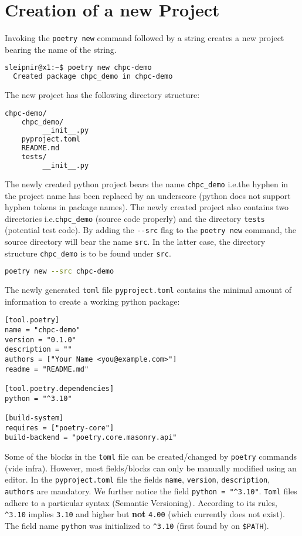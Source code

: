 \documentclass[10pt]{article}
\begin{document}
\section{Creation of a new Project}
Invoking the \lstinline[language=bash]{poetry new} command followed by a string creates a new project bearing the name of the string.
\begin{lstlisting}[language=bash]
sleipnir@x1:~$ poetry new chpc-demo
  Created package chpc_demo in chpc-demo
\end{lstlisting}
The new project has the following directory structure:
\begin{lstlisting}[language=bash]
chpc-demo/
    chpc_demo/
         __init__.py
    pyproject.toml
    README.md
    tests/
         __init__.py
\end{lstlisting}
The newly created python project bears the name \texttt{chpc\_demo} i.e.\;the hyphen in the project name has been 
replaced by an underscore (python does not support hyphen tokens in package names).
The newly created project also contains two directories i.e.\;\texttt{chpc\_demo} (source code properly) and 
the directory \texttt{tests} (potential test code). By adding the \lstinline[language=bash]{--src} flag to the 
\lstinline[language=bash]{poetry new} command, the source directory will bear the name \texttt{src}. 
In the latter case, the directory structure \texttt{chpc\_demo} is to be found 
under \texttt{src}. 
\begin{lstlisting}[language=bash]
poetry new --src chpc-demo
\end{lstlisting}
The newly generated \texttt{toml}\cite{TOML:2023} file \texttt{pyproject.toml} contains the minimal amount of information to create a working python package:
\begin{verbatim}
[tool.poetry]
name = "chpc-demo"
version = "0.1.0"
description = ""
authors = ["Your Name <you@example.com>"]
readme = "README.md"

[tool.poetry.dependencies]
python = "^3.10"

[build-system]
requires = ["poetry-core"]
build-backend = "poetry.core.masonry.api"
\end{verbatim}	
Some of the blocks in the \texttt{toml} file can be created/changed by
\texttt{poetry} commands (vide infra). However, most fields/blocks can only be manually modified using an editor. 
In the \texttt{pyproject.toml} file the fields \texttt{name}, \texttt{version}, \texttt{description}, \texttt{authors} are mandatory.
We further notice the field \texttt{python = "\textasciicircum3.10"}. \texttt{Toml} files adhere to a particular syntax (Semantic Versioning)\,\cite{SEMANVER:2023}.
According to its rules, 
\texttt{\textasciicircum3.10} implies \texttt{3.10} and higher but \textbf{not} \texttt{4.00} (which currently does not exist). 
The field name \texttt{python} was initialized to \texttt{\textasciicircum3.10} (first found by on \texttt{\$PATH}).
\end{document}
